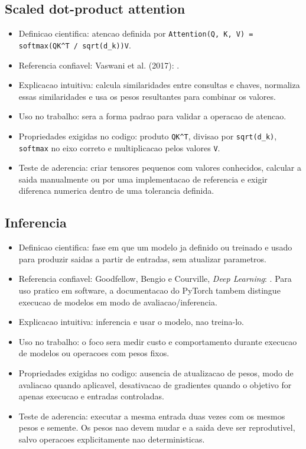 \subsection{Scaled dot-product attention}


\begin{itemize}
\item Definicao cientifica: atencao definida por
\texttt{Attention(Q, K, V) = softmax(QK\textasciicircum{}T /\allowbreak{} sqrt(d\_\allowbreak{}k))V}.
\item Referencia confiavel: Vaswani et al. (2017):
.
\item Explicacao intuitiva: calcula similaridades entre consultas e chaves,
normaliza essas similaridades e usa os pesos resultantes para combinar os
valores.
\item Uso no trabalho: sera a forma padrao para validar a operacao de atencao.
\item Propriedades exigidas no codigo: produto \texttt{QK\textasciicircum{}T}, divisao por \texttt{sqrt(d\_\allowbreak{}k)},
\texttt{softmax} no eixo correto e multiplicacao pelos valores \texttt{V}.
\item Teste de aderencia: criar tensores pequenos com valores conhecidos, calcular
a saida manualmente ou por uma implementacao de referencia e exigir diferenca
numerica dentro de uma tolerancia definida.
\end{itemize}


\subsection{Inferencia}


\begin{itemize}
\item Definicao cientifica: fase em que um modelo ja definido ou treinado e usado
para produzir saidas a partir de entradas, sem atualizar parametros.
\item Referencia confiavel: Goodfellow, Bengio e Courville, \emph{Deep Learning}:
. Para uso pratico em software, a
documentacao do PyTorch tambem distingue execucao de modelos em modo de
avaliacao/inferencia.
\item Explicacao intuitiva: inferencia e usar o modelo, nao treina-lo.
\item Uso no trabalho: o foco sera medir custo e comportamento durante execucao de
modelos ou operacoes com pesos fixos.
\item Propriedades exigidas no codigo: ausencia de atualizacao de pesos, modo de
avaliacao quando aplicavel, desativacao de gradientes quando o objetivo for
apenas execucao e entradas controladas.
\item Teste de aderencia: executar a mesma entrada duas vezes com os mesmos pesos e
semente. Os pesos nao devem mudar e a saida deve ser reprodutivel, salvo
operacoes explicitamente nao deterministicas.
\end{itemize}


